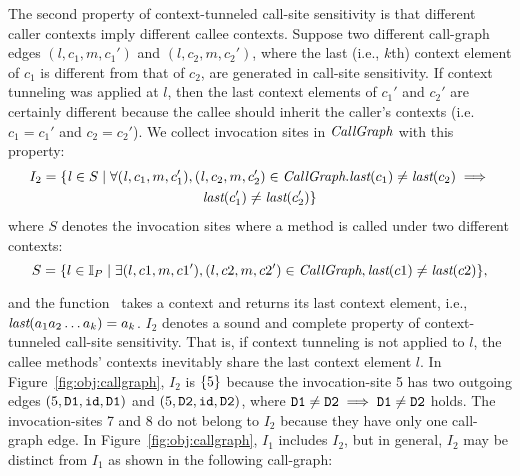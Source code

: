 

The second property of context-tunneled call-site sensitivity is that
different caller contexts imply different callee contexts. Suppose
two different call-graph edges $(l, c_1, m, c_1')$ and
$(l, c_2, m, c_2')$, where the last (i.e., $k$th) context element of $c_1$ is different from that of $c_2$, are generated in call-site sensitivity. 
If context tunneling was applied at $l$, then the last context elements of $c_1'$ and
$c_2'$ are certainly different because the callee should inherit the
caller's contexts (i.e. $c_1 = c_1'$ and $c_2 = c_2'$).
We collect invocation sites in $\textit{CallGraph}$ with this property: %
\begin{multline*}
	I_2 =  \{{\it l} \in S \mid \forall ({\it l}, c_1, m, c_1'), ({\it l}, c_2, m, c_2') \in
	\textit{CallGraph}.  \text{\it last}(c_1) \neq \text{\it last}(c_2) \implies \\ \text{\it last}(c_1') \neq \text{\it last}(c_2')\}
\end{multline*}
where $S$ denotes the invocation sites where a method is called under two different contexts:
\[
S = \{l \in \mathbb{I}_P \mid \exists (l,c1,m,c1'),(l,c2,m,c2')\in \textit{CallGraph},  \text{\it last}(c1) \not = \text{\it last}(c2)\},
\]


and the function \kth~takes a context and returns its last context element, i.e., $\text{\it last}(a_1a_2\dots a_k) = a_k$.  
 $I_2$ denotes a
sound and complete property of context-tunneled call-site sensitivity. 
That is, if context tunneling is not applied to $l$, the callee methods'
contexts inevitably share the last context element $l$.
In Figure~\ref{fig:obj:callgraph}, $I_2$ is $\{ 5 \}$ because the invocation-site 5
has two outgoing edges $(5,{\tt D1},\texttt{id},{\tt D1})$ and $(5,{\tt
D2},\texttt{id},{\tt D2})$, where ${\tt D1} \neq {\tt
D2} \implies {\tt D1} \neq {\tt D2}$ holds. 
The invocation-sites 7 and 8 do not
belong to $I_2$ because they have only one call-graph edge.
In Figure~\ref{fig:obj:callgraph}, $I_1$ includes $I_2$, but in
general, $I_2$
may be distinct from $I_1$ as shown in the following call-graph:

